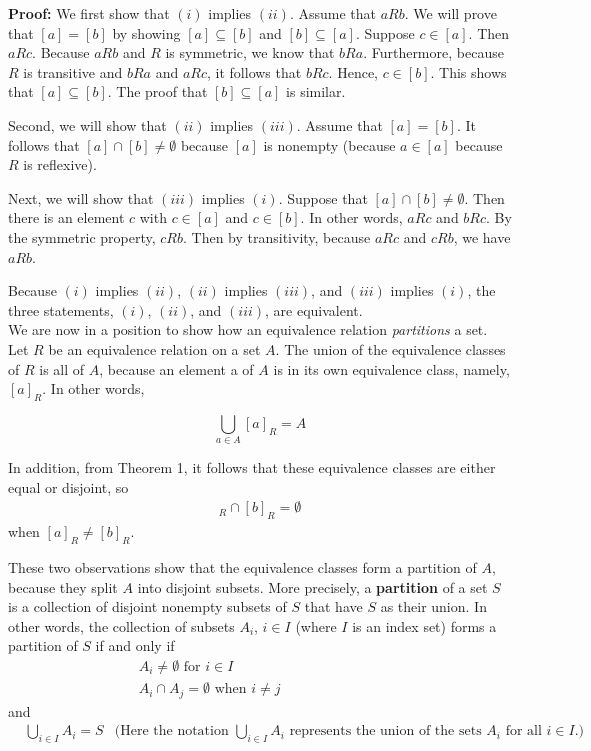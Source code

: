 \documentclass[11pt]{article}
\begin{document}
\textbf{Proof:} We first show that $(i)$ implies $(ii)$. Assume that $a R b$. We will prove that $[a] = [b]$ by showing $[a] \subseteq [b]$ and $[b] \subseteq [a]$. Suppose $c \in [a]$. Then $a R c$. Because $a R b$ and $R$ is symmetric, we know that $b R a$. Furthermore, because $R$ is transitive and $b R a$ and $a R c$, it follows that $b R c$. Hence, $c \in [b]$. This shows that $[a] \subseteq [b]$. The proof that $[b] \subseteq [a]$ is similar.

Second, we will show that $(ii)$ implies $(iii)$. Assume that $[a] = [b]$. It follows that $[a] \cap [b] \neq \emptyset$ because $[a]$ is nonempty (because $a \in [a]$ because $R$ is reflexive).

Next, we will show that $(iii)$ implies $(i)$. Suppose that $[a] \cap [b] \neq \emptyset$. Then there is an element $c$ with $c \in [a]$ and $c \in [b]$. In other words, $a R c$ and $b R c$. By the symmetric property, $c R b$. Then by transitivity, because $a R c$ and $c R b$, we have $a R b$.

Because $(i)$ implies $(ii)$, $(ii)$ implies $(iii)$, and $(iii)$ implies $(i)$, the three statements, $(i)$, $(ii)$, and $(iii)$, are equivalent.\\

We are now in a position to show how an equivalence relation \textit{partitions} a set. Let $R$ be an equivalence relation on a set $A$. The union of the equivalence classes of $R$ is all of $A$, because an element a of $A$ is in its own equivalence class, namely, $[a]_R$. In other words,

\begin{equation*}
    \bigcup_{a \in A} [a]_R = A
\end{equation*}

\noindent In addition, from Theorem 1, it follows that these equivalence classes are either equal or disjoint, so
\begin{align*}
    [a]_R \cap [b]_R = \emptyset
\end{align*}
\noindent when $[a]_R \neq [b]_R$.

These two observations show that the equivalence classes form a partition of $A$, because they split $A$ into disjoint subsets. More precisely, a \textbf{partition} of a set $S$ is a collection of disjoint nonempty subsets of $S$ that have $S$ as their union. In other words, the collection of subsets $A_i$, $i \in I$ (where $I$ is an index set) forms a partition of $S$ if and only if
\begin{align*}
    &A_i \neq \emptyset \text{ for } i \in I & & & & & & & & & &\\   
    &A_i \cap A_j = \emptyset \text{ when } i \neq j & & & & & & & & & &
\end{align*}
and
\begin{align*}
    &\bigcup_{i \in I} A_i = S &\text{(Here the notation $\bigcup_{i \in I} A_i$ represents the union of the sets $A_i$ for all $i \in I$.)}
\end{align*}
\end{document}
